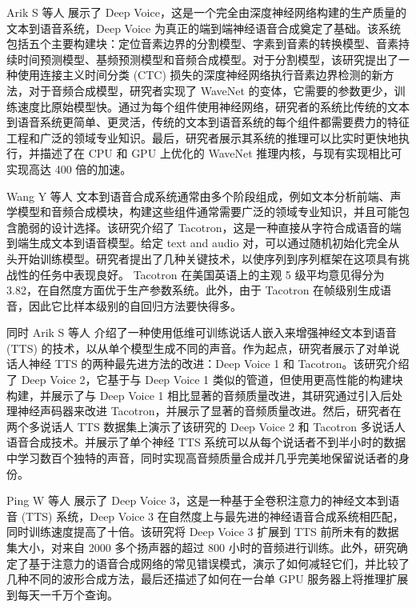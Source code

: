 Arik S 等人 \cite{arik2017deep}展示了 Deep Voice，这是一个完全由深度神经网络构建的生产质量的文本到语音系统，Deep Voice 为真正的端到端神经语音合成奠定了基础。该系统包括五个主要构建块：定位音素边界的分割模型、字素到音素的转换模型、音素持续时间预测模型、基频预测模型和音频合成模型。对于分割模型，该研究提出了一种使用连接主义时间分类 (CTC) 损失的深度神经网络执行音素边界检测的新方法，对于音频合成模型，研究者实现了 WaveNet 的变体，它需要的参数更少，训练速度比原始模型快。通过为每个组件使用神经网络，研究者的系统比传统的文本到语音系统更简单、更灵活，传统的文本到语音系统的每个组件都需要费力的特征工程和广泛的领域专业知识。最后，研究者展示其系统的推理可以比实时更快地执行，并描述了在 CPU 和 GPU 上优化的 WaveNet 推理内核，与现有实现相比可实现高达 400 倍的加速。

Wang Y 等人 \cite{wang2017tacotron}文本到语音合成系统通常由多个阶段组成，例如文本分析前端、声学模型和音频合成模块，构建这些组件通常需要广泛的领域专业知识，并且可能包含脆弱的设计选择。该研究介绍了 Tacotron，这是一种直接从字符合成语音的端到端生成文本到语音模型。给定 text and audio 对，可以通过随机初始化完全从头开始训练模型。研究者提出了几种关键技术，以使序列到序列框架在这项具有挑战性的任务中表现良好。 Tacotron 在美国英语上的主观 5 级平均意见得分为 3.82，在自然度方面优于生产参数系统。此外，由于 Tacotron 在帧级别生成语音，因此它比样本级别的自回归方法要快得多。

同时 Arik S 等人 \cite{gibiansky2017deep} 介绍了一种使用低维可训练说话人嵌入来增强神经文本到语音 (TTS) 的技术，以从单个模型生成不同的声音。作为起点，研究者展示了对单说话人神经 TTS 的两种最先进方法的改进：Deep Voice 1 和 Tacotron。该研究介绍了 Deep Voice 2，它基于与 Deep Voice 1 类似的管道，但使用更高性能的构建块构建，并展示了与 Deep Voice 1 相比显著的音频质量改进，其研究通过引入后处理神经声码器来改进 Tacotron，并展示了显著的音频质量改进。然后，研究者在两个多说话人 TTS 数据集上演示了该研究的 Deep Voice 2 和 Tacotron 多说话人语音合成技术。并展示了单个神经 TTS 系统可以从每个说话者不到半小时的数据中学习数百个独特的声音，同时实现高音频质量合成并几乎完美地保留说话者的身份。

Ping W 等人 \cite{ping2017deep}展示了 Deep Voice 3，这是一种基于全卷积注意力的神经文本到语音 (TTS) 系统，Deep Voice 3 在自然度上与最先进的神经语音合成系统相匹配，同时训练速度提高了十倍。该研究将 Deep Voice 3 扩展到 TTS 前所未有的数据集大小，对来自 2000 多个扬声器的超过 800 小时的音频进行训练。此外，研究确定了基于注意力的语音合成网络的常见错误模式，演示了如何减轻它们，并比较了几种不同的波形合成方法，最后还描述了如何在一台单 GPU 服务器上将推理扩展到每天一千万个查询。

